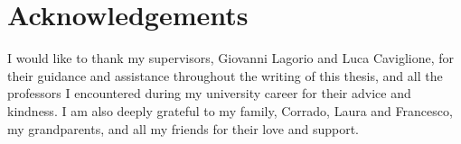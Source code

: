 \chapter*{Acknowledgements}
\thispagestyle{empty}

I would like to thank my supervisors, Giovanni Lagorio and Luca Caviglione, 
for their guidance and assistance throughout the writing of this thesis, 
and all the professors I encountered during my university career 
for their advice and kindness.
I am also deeply grateful to my family, Corrado, Laura and Francesco, 
my grandparents, and all my friends for their love and support.